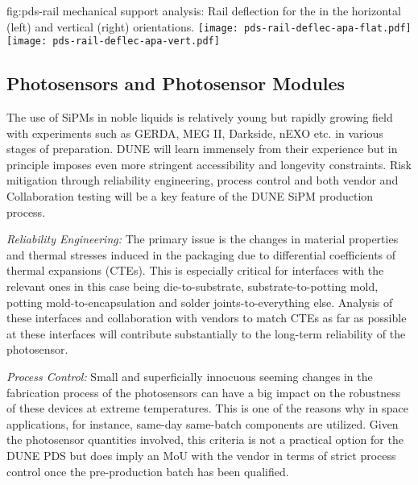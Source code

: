 \begin{dunefigure}{fig:pds-rail}
{ mechanical support analysis: Rail deflection for the  in the horizontal (left) and vertical (right) orientations.}
	\texttt{[image: pds-rail-deflec-apa-flat.pdf]} 
	\texttt{[image: pds-rail-deflec-apa-vert.pdf]}\\
\end{dunefigure}


\subsection{Photosensors and Photosensor Modules}
\label{sec:fdsp-pd-assy-psm}

The use of SiPMs in noble liquids is relatively young but rapidly growing field with experiments such as GERDA, MEG II, Darkside, nEXO etc. in various stages of preparation. DUNE will learn immensely from their experience but in principle imposes even more stringent accessibility and longevity constraints. Risk mitigation through reliability engineering, process control and both vendor and Collaboration testing will be a key feature of the DUNE SiPM production process.

{\it{Reliability Engineering:}} The primary issue is the changes in material properties and thermal stresses induced in the packaging due to differential coefficients of thermal expansions (CTEs). This is especially critical for interfaces with the relevant ones in this case being die-to-substrate, substrate-to-potting mold, potting mold-to-encapsulation and solder joints-to-everything else. Analysis of these interfaces and collaboration with vendors to match CTEs as far as possible at these interfaces will contribute substantially to the long-term reliability of the photosensor.

{\it{Process Control:}} Small and superficially innocuous seeming changes in the fabrication process of the photosensors can have a big impact on the robustness of these devices at extreme temperatures. This is one of the reasons why in space applications, for instance, same-day same-batch components are utilized. Given the photosensor quantities involved, this criteria is not a practical option for the DUNE PDS but does imply an MoU with the vendor in terms of strict process control once the pre-production batch has been qualified.

